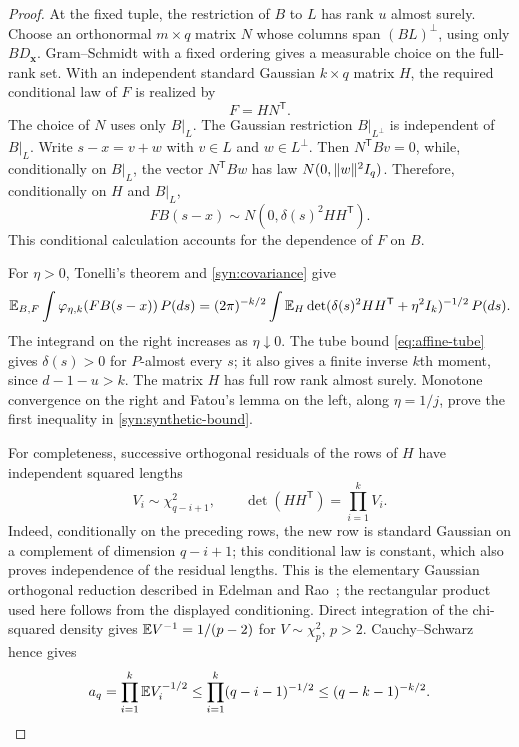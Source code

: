 \begin{proof}
At the fixed tuple, the restriction of \(B\) to \(L\) has rank \(u\)
almost surely.  Choose an orthonormal \(m\times q\) matrix \(N\) whose
columns span \((BL)^\perp\), using only \(BD_{\mathbf x}\).  Gram--Schmidt
with a fixed ordering gives a measurable choice on the full-rank set.
With an independent standard Gaussian \(k\times q\) matrix \(H\), the
required conditional law of \(F\) is realized by
\begin{equation}\label{syn:synthetic-realization}
 F=HN^{\mathsf T}.
\end{equation}
The choice of \(N\) uses only \(B|_L\).  The Gaussian restriction
\(B|_{L^\perp}\) is independent of \(B|_L\).  Write \(s-x=v+w\) with
\(v\in L\) and \(w\in L^\perp\).  Then \(N^{\mathsf T}Bv=0\), while,
conditionally on \(B|_L\), the vector \(N^{\mathsf T}Bw\) has law
\(N(0,\lVert w\rVert^2I_q)\).  Therefore, conditionally on \(H\) and \(B|_L\),
\begin{equation}\label{syn:covariance}
 FB(s-x)\sim N(0,\delta(s)^2HH^{\mathsf T}).
\end{equation}
This conditional calculation accounts for the dependence of \(F\) on \(B\).

For \(\eta>0\), Tonelli's theorem and \eqref{syn:covariance} give
\[
 \mathbb E_{B,F}\int\varphi_{\eta,k}(FB(s-x))\,P(ds)
 =(2\pi)^{-k/2}\int
   \mathbb E_H\det(\delta(s)^2HH^{\mathsf T}+\eta^2I_k)^{-1/2}\,P(ds).
\]
The integrand on the right increases as \(\eta\downarrow0\).  The tube
bound \eqref{eq:affine-tube} gives \(\delta(s)>0\) for \(P\)-almost every
\(s\); it also gives a finite inverse \(k\)th moment, since
\(d-1-u>k\).  The matrix \(H\) has full row rank almost surely.
Monotone convergence on the right and Fatou's lemma on the left, along
\(\eta=1/j\), prove the first inequality in \eqref{syn:synthetic-bound}.

For completeness, successive orthogonal residuals of the rows of \(H\)
have independent squared lengths
\[
 V_i\sim\chi^2_{q-i+1},\qquad
 \det(HH^{\mathsf T})=\prod_{i=1}^kV_i.
\]
Indeed, conditionally on the preceding rows, the new row is standard
Gaussian on a complement of dimension \(q-i+1\); this conditional law is
constant, which also proves independence of the residual lengths.  This is
the elementary Gaussian orthogonal reduction described in
Edelman and Rao~\cite[Section~5]{EdelmanRao2005}; the rectangular product
used here follows from the displayed conditioning.  Direct integration of
the chi-squared density gives \(\mathbb E V^{-1}=1/(p-2)\) for
\(V\sim\chi_p^2\), \(p>2\).  Cauchy--Schwarz hence gives
\[
 a_q=\prod_{i=1}^k\mathbb E V_i^{-1/2}
 \le\prod_{i=1}^k(q-i-1)^{-1/2}
 \le(q-k-1)^{-k/2}.
\]


\end{proof}
